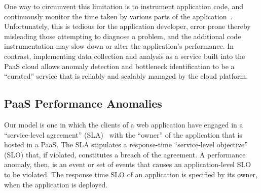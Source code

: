 One way to circumvent this 
limitation is to instrument application code, and continuously monitor the time taken by various
parts of the application~\cite{newrelic,datadog,dynatrace}. 
Unfortunately, this is tedious for the application developer, 
error prone thereby misleading those attempting to
diagnose a problem, and
the additional code instrumentation may slow down or alter the application's
performance. 
In contrast, implementing data collection and analysis as a service built into the PaaS cloud allows 
anomaly detection and bottleneck identification to be a ``curated'' service that is 
reliably and scalably managed by the cloud platform. %

\subsection{PaaS Performance Anomalies}


Our model is one in which the clients of a web application have engaged in a
``service-level agreement'' (SLA)~\cite{Keller:2003:WFS:635430.635442}
with the ``owner'' of the application that is hosted in a PaaS.  The SLA
stipulates a response-time ``service-level objective'' (SLO) that, if violated, constitutes a breach of the
agreement. A performance anomaly, then, is an event or set of events that
causes an application-level SLO to be violated. The response time SLO of an application
is specified by its owner, when the application is deployed.

